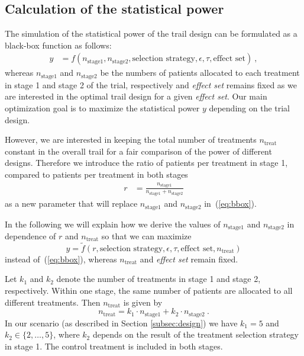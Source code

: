 \documentclass[bimj,fleqn]{w-art}
\theoremstyle{plain}
\theoremstyle{definition}
\begin{document}
\subsection{Calculation of the statistical power}

The simulation of the statistical power of the trail design can be formulated as a black-box function as follows:
\begin{align}
  \label{eq:bbox}
  y & = f(n_{\text{stage1}}, n_{\text{stage2}}, \text{selection strategy}, \epsilon, \tau, \text{effect set}) \ ,
\end{align}
whereas $n_{\text{stage1}}$ and $n_{\text{stage2}}$ be the numbers of patients allocated to each treatment in stage 1 and stage 2 of the trial, respectively and \emph{effect set} remains fixed as we are interested in the optimal trail design for a given \emph{effect set}.
Our main optimization goal is to maximize the statistical power $y$ depending on the trial design. 

However, we are interested in keeping the total number of treatments $n_{\text{treat}}$ constant in the overall trail for a fair comparison of the power of different designs.
Therefore we introduce the ratio of patients per treatment in stage 1, compared to patients per treatment in both stages
\begin{align}
  \label{eq:r}
 r & = \frac{n_{\text{stage1}}}{n_{\text{stage1}}+n_{\text{stage2}}}
\end{align}
as a new parameter that will replace $n_{\text{stage1}}$ and $n_{\text{stage2}}$ in~(\ref{eq:bbox}). 

In the following we will explain how we derive the values of $n_{\text{stage1}}$ and $n_{\text{stage2}}$ in dependence of $r$ and $n_{\text{treat}}$ so that we can maximize
\begin{equation}
  \label{eq:bbox2}
  y = \tilde{f}(r, \text{selection strategy}, \epsilon, \tau, \text{effect set}, n_{\text{treat}})
\end{equation}
instead of~(\ref{eq:bbox}), whereas $n_{\text{treat}}$ and \emph{effect set} remain fixed.

Let $k_1$ and $k_2$ denote the number of treatments in stage 1 and stage 2, respectively. 
Within one stage, the same number of patients are allocated to all different treatments. 
Then $n_{\text{treat}}$ is given by
\begin{equation}
  \label{eq:ntreat}
  n_{\text{treat}} = k_1 \cdot n_{\text{stage1}} + k_2 \cdot n_{\text{stage2}} \ .
\end{equation}
In our scenario (as described in Section \ref{subsec:design}) we have $k_1 = 5$ and $k_2 \in \{2, \ldots, 5\}$, where $k_2$ depends on the result of the treatment selection strategy in stage 1.
The control treatment is included in both stages.
\end{document}
